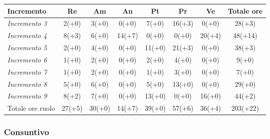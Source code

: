 {{{{{{{{{	\begin{center}
		\renewcommand{\arraystretch}{1.4}
		\begin{tabularx}{\textwidth}{|X|c|c|c|c|c|c|c|}
			\hline
			\rowcolor{airforceblue}
			\textbf{Incremento} & \textbf{Re} & \textbf{Am} & \textbf{An} & \textbf{Pt} & \textbf{Pr} & \textbf{Ve} & \textbf{Totale ore}\\
			\hline
			\textit{Incremento 3} & 2(+0) & 3(+0) & 0(+0) & 7(+0) & 16(+3) & 0(+0) & 28(+3)\\
			\hline
			\textit{Incremento 4} & 8(+3) & 6(+0) & 14(+7) & 0(+0) & 0(+0) & 20(+4) & 48(+14) \\
			\hline
			\textit{Incremento 5} & 2(+0) & 4(+0) & 0(+0) & 11(+0) & 21(+3) & 0(+0) & 38(+3)\\
			\hline
			\textit{Incremento 6} & 1(+0) & 2(+0) & 0(+0) & 2(+0) & 4(+0) & 0(+0) & 9(+0)\\
			\hline
			\textit{Incremento 7} & 1(+0) & 2(+0) & 0(+0) & 1(+0) & 3(+0) & 0(+0) & 7(+0)\\
			\hline
			\textit{Incremento 8} & 5(+0) & 6(+0) & 0(+0) & 5(+0) & 13(+0) & 0(+0) & 29(+0)\\
			\hline
			\textit{Incremento 9} & 8(+2) & 7(+0) & 0(+0) & 13(+0) & 0(+0) & 16(+0) & 44(+2)\\
			\hline
			Totale ore ruolo & 27(+5) & 30(+0) & 14(+7) & 39(+0) & 57(+6) & 36(+4) & 203(+22)\\
			\hline
		\end{tabularx}
	\end{center}

\subsubsection{Consuntivo}\label{ConsuntivoSecondoPeriodoDiProgettazioneDiDettaglioCodificaIncrementiCosto}
	
}}}}}}}}}
